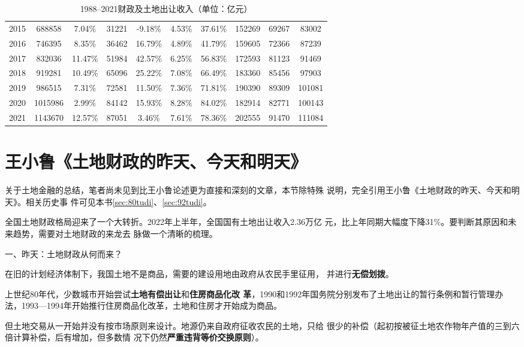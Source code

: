 \begin{table}[p]
{\begin{tabular}{@{}cccccccccc@{}}
2015 & 688858  & 7.04\%  & 31221 & -9.18\%   & 4.53\% & 37.61\% & 152269 & 69267 & 83002  \\
2016 & 746395  & 8.35\%  & 36462 & 16.79\%   & 4.89\% & 41.79\% & 159605 & 72366 & 87239  \\
2017 & 832036  & 11.47\% & 51984 & 42.57\%   & 6.25\% & 56.83\% & 172593 & 81123 & 91469  \\
2018 & 919281  & 10.49\% & 65096 & 25.22\%   & 7.08\% & 66.49\% & 183360 & 85456 & 97903  \\
2019 & 986515  & 7.31\%  & 72581 & 11.50\%   & 7.36\% & 71.81\% & 190390 & 89309 & 101081 \\
2020 & 1015986 & 2.99\%  & 84142 & 15.93\%   & 8.28\% & 84.02\% & 182914 & 82771 & 100143 \\
2021 & 1143670 & 12.57\% & 87051 & 3.46\%    & 7.61\% & 78.36\% & 202555 & 91470 & 111084 \\ \bottomrule
\end{tabular}%
}
\StopDefiningTabulars
\caption{1988--2021财政及土地出让收入（单位：亿元）}
\label{tab:19882021}
\end{table}

\section{王小鲁《土地财政的昨天、今天和明天》}

关于土地金融的总结，笔者尚未见到比王小鲁论述更为直接和深刻的文章，本节除特殊
说明，完全引用王小鲁《土地财政的昨天、今天和明天》\cite{wxljintian}。相关历史事
件可见本书\cref{sec:80tudi}、\cref{sec:92tudi}。

全国土地财政格局迎来了一个大转折。2022年上半年，全国国有土地出让收入2.36万亿
元，比上年同期大幅度下降31\%。要判断其原因和未来趋势，需要对土地财政的来龙去
脉做一个清晰的梳理。

{\heiti 一、昨天：土地财政从何而来？}

在旧的计划经济体制下，我国土地不是商品，需要的建设用地由政府从农民手里征用，
并进行\textbf{无偿划拨}。

上世纪80年代，少数城市开始尝试\textbf{土地有偿出让}和\textbf{住房商品化改
  革}，1990和1992年国务院分别发布了土地出让的暂行条例和暂行管理办
法，1993—1994年开始推行住房商品化改革，土地和住房才开始成为商品。

但土地交易从一开始并没有按市场原则来设计。地源仍来自政府征收农民的土地，只给
很少的补偿（起初按被征土地农作物年产值的三到六倍计算补偿，后有增加，但多数情
况下仍然\textbf{严重违背等价交换原则}）。

